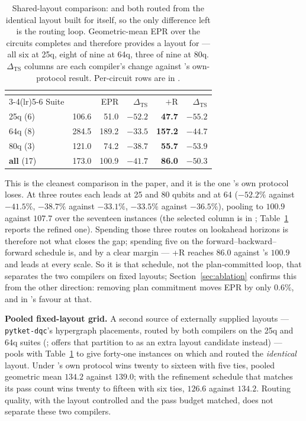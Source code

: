 \begin{table}[t]
\centering
\caption{Shared-layout comparison: \dSABRE{} and \PORTER{} both routed
  from the identical layout \TeleSABRE{} built for itself, so the only
  difference left is the routing loop. Geometric-mean EPR
  over the circuits \TeleSABRE{} completes and therefore provides a
  layout for --- all six at 25q, eight of nine at 64q, three of nine at
  80q. $\Delta_\mathrm{TS}$ columns are each compiler's change against
  \TeleSABRE{}'s own-protocol result. Per-circuit rows are in
  \appTables{}.}
\label{tab:shared}
\setlength{\tabcolsep}{4pt}
\small
\begin{tabular}{@{}l r rr rr@{}}
\toprule
 & & \multicolumn{2}{c}{\dSABRE{}} & \multicolumn{2}{c}{\PORTER{}} \\
\cmidrule(lr){3-4}\cmidrule(lr){5-6}
Suite & \TeleSABRE{} & EPR & $\Delta_\mathrm{TS}$ & $+$R & $\Delta_\mathrm{TS}$ \\
\midrule
25q (6) & 106.6 & 51.0 & $-52.2$ & \textbf{47.7} & $\mathbf{-55.2}$ \\
64q (8) & 284.5 & 189.2 & $-33.5$ & \textbf{157.2} & $\mathbf{-44.7}$ \\
80q (3) & 121.0 & 74.2 & $-38.7$ & \textbf{55.7} & $\mathbf{-53.9}$ \\
\textbf{all} (17) & 173.0 & 100.9 & $-41.7$ & \textbf{86.0} & $\mathbf{-50.3}$ \\
\bottomrule
\end{tabular}
\end{table}


This is the cleanest comparison in the paper, and it is the one
\PORTER{}'s own protocol loses. At three routes each \dSABRE{} leads at
25 and 80 qubits and \PORTER{} at 64 ($-52.2\%$ against $-41.5\%$,
$-38.7\%$ against $-33.1\%$, $-33.5\%$ against $-36.5\%$), pooling to
$100.9$ against $107.7$ over the seventeen instances (the selected
column is in \appTables{}; Table~\ref{tab:shared} reports the refined
one). Spending those three routes on lookahead horizons is therefore
not what closes the gap; spending five on the
forward--backward--forward schedule is, and by a clear margin ---
\PORTER{}+R reaches $86.0$ against \dSABRE{}'s $100.9$ and leads at
every scale. So it is that schedule, not the plan-committed loop, that
separates the two compilers on fixed layouts;
Section~\ref{sec:ablation} confirms this from the other direction:
removing plan commitment moves EPR by only $0.6\%$, and in \PORTER{}'s
favour at that.

\textbf{Pooled fixed-layout grid.} A second source of externally
supplied layouts --- \texttt{pytket-dqc}'s hypergraph placements,
routed by both compilers on the 25q and 64q suites (\appPytket{};
\appOptin{} offers that partition to \PORTER{} as an extra layout
candidate instead) --- pools with Table~\ref{tab:shared} to give
forty-one instances on which \dSABRE{} and \PORTER{} routed the
\emph{identical} layout. Under \PORTER{}'s own protocol \dSABRE{} wins
twenty to sixteen with five ties, pooled geometric mean $134.2$ against
$139.0$; with the refinement schedule that matches its pass count
\PORTER{} wins twenty to fifteen with six ties, $126.6$ against
$134.2$. Routing quality, with the layout controlled and the pass
budget matched, does not separate these two compilers.

